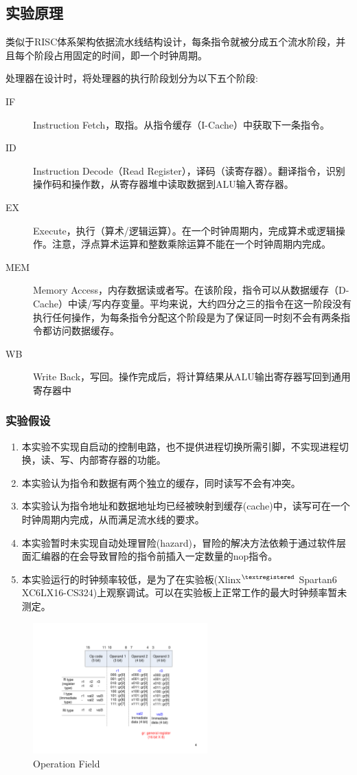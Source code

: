 \documentclass[10pt,a4paper,fleqn]{article}
\begin{document}
  \subsection*{实验原理}
类似于RISC体系架构依据流水线结构设计，每条指令就被分成五个流水阶段，并且每个阶段占用固定的时间，即一个时钟周期。

\par 处理器在设计时，将处理器的执行阶段划分为以下五个阶段:
\begin{description}
  \item[IF] Instruction Fetch，取指。从指令缓存（I-Cache）中获取下一条指令。
  \item[ID] Instruction Decode（Read Register），译码（读寄存器）。翻译指令，识别操作码和操作数，从寄存器堆中读取数据到ALU输入寄存器。
  \item[EX] Execute，执行（算术/逻辑运算）。在一个时钟周期内，完成算术或逻辑操作。注意，浮点算术运算和整数乘除运算不能在一个时钟周期内完成。
  \item[MEM] Memory Access，内存数据读或者写。在该阶段，指令可以从数据缓存（D-Cache）中读/写内存变量。平均来说，大约四分之三的指令在这一阶段没有执行任何操作，为每条指令分配这个阶段是为了保证同一时刻不会有两条指令都访问数据缓存。
  \item[WB] Write Back，写回。操作完成后，将计算结果从ALU输出寄存器写回到通用寄存器中
\end{description}
\subsubsection*{实验假设}
\begin{enumerate}
  \item 本实验不实现自启动的控制电路，也不提供进程切换所需引脚，不实现进程切换，读、写、内部寄存器的功能。
  \item 本实验认为指令和数据有两个独立的缓存，同时读写不会有冲突。
  \item 本实验认为指令地址和数据地址均已经被映射到缓存(cache)中，读写可在一个时钟周期内完成，从而满足流水线的要求。
  \item 本实验暂时未实现自动处理冒险(hazard)，冒险的解决方法依赖于通过软件层面汇编器的在会导致冒险的指令前插入一定数量的nop指令。
  \item 本实验运行的时钟频率较低，是为了在实验板(Xlinx$^{\textregistered}$ Spartan6 XC6LX16-CS324)上观察调试。可以在实验板上正常工作的最大时钟频率暂未测定。
\end{enumerate}
\begin{figure}[H]
  \centering
  \includegraphics[width=0.6\textwidth]{figure/OpField.pdf}
  \caption{Operation Field}
\end{figure}
\end{document}
